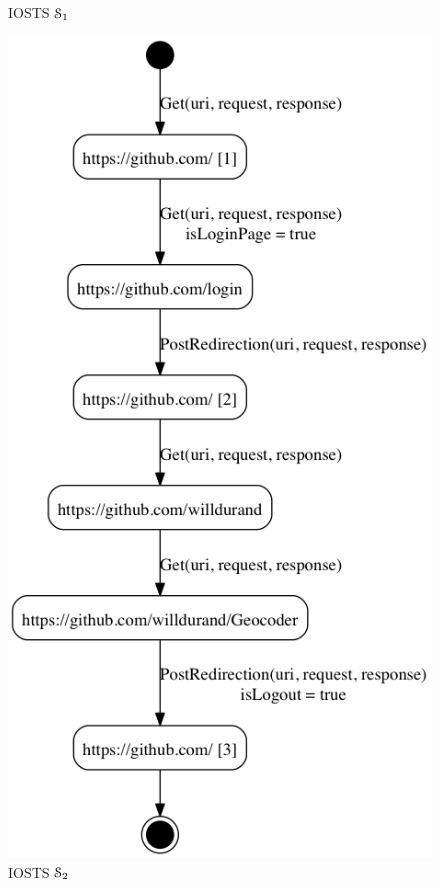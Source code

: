 \begin{figure}[H]
\begin{minipage}{.5\textwidth}
    \caption{IOSTS $\EuScript{S}_1$}
    \label{fig:github:iosts:1}
\end{minipage}
\begin{minipage}{.5\textwidth}
    \includegraphics[width=1.0\linewidth]{figures/gh-iosts-2.png}

    \caption{IOSTS $\EuScript{S}_2$}
    \label{fig:github:iosts:2}
\end{minipage}
\end{figure}


